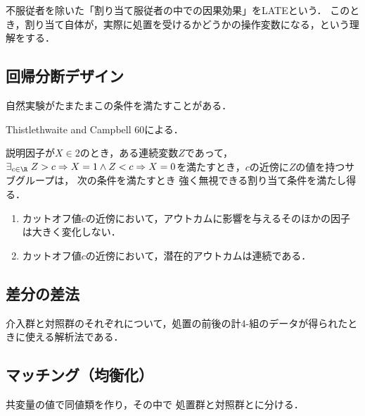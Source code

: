 \documentclass[uplatex,dvipdfmx]{jsreport}
\begin{document}
\begin{example}[局所処置効果]
    不服従者を除いた「割り当て服従者の中での因果効果」をLATEという．
    このとき，割り当て自体が，実際に処置を受けるかどうかの操作変数になる，という理解をする．
\end{example}

\subsection{回帰分断デザイン}

\begin{tcolorbox}[colframe=ForestGreen, colback=ForestGreen!10!white,breakable,colbacktitle=ForestGreen!40!white,coltitle=black,fonttitle=\bfseries\sffamily,
title=]
    自然実験がたまたまこの条件を満たすことがある．
\end{tcolorbox}

\begin{history}
    Thistlethwaite and Campbell 60による．
\end{history}

\begin{definition}
    説明因子が$X\in 2$のとき，ある連続変数$Z$であって，$\exists_{c\in\R}\;Z>c\Rightarrow X=1\land Z<c\Rightarrow X=0$を満たすとき，$c$の近傍に$Z$の値を持つサブグループは，
    次の条件を満たすとき
    強く無視できる割り当て条件を満たし得る．
    \begin{enumerate}
        \item カットオフ値$c$の近傍において，アウトカムに影響を与えるそのほかの因子は大きく変化しない．
        \item カットオフ値$c$の近傍において，潜在的アウトカムは連続である．
    \end{enumerate}
\end{definition}

\subsection{差分の差法}

介入群と対照群のそれぞれについて，処置の前後の計4-組のデータが得られたときに使える解析法である．

\subsection{マッチング（均衡化）}

共変量の値で同値類を作り，その中で
処置群と対照群とに分ける．
\end{document}
